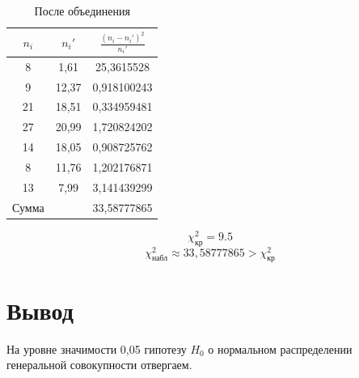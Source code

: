 \documentclass{article}
\begin{document}
\begin{center}
    \begin{table}[H]
        \centering
        \begin{tabular}{|*{3}{c|}}
            \hline
            $n_i$ &$n_i'$& $\frac{(n_i-n_i')^2}{n_i'}$\\
            \hline
            8 & 1,61 & 25,3615528 \\
            \hline
            9 & 12,37 & 0,918100243 \\
            \hline
            21 & 18,51 & 0,334959481 \\
            \hline
            27 & 20,99 & 1,720824202 \\
            \hline
            14 & 18,05 & 0,908725762 \\
            \hline
            8 & 11,76 & 1,202176871 \\
            \hline
            13 & 7,99 & 3,141439299\\
            \hline
             Сумма& &33,58777865\\
             \hline
        \end{tabular}
        \caption{После объединения}
    \end{table}
\end{center}
\[\chi^2_{\text{кр}} = 9.5\]
\[\chi^2_{\text{набл}} \approx 33,58777865 > \chi^2_{\text{кр}}\]
\section*{Вывод}
На уровне значимости 0,05 гипотезу $H_0$ о нормальном распределении генеральной совокупности отвергаем.
\end{document}
